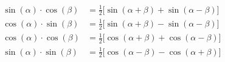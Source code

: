\begin{equation}
\begin{split}
    \sin(\alpha) \cdot \cos(\beta) &= \frac{1}{2} \Big[ \sin(\alpha + \beta) + \sin(\alpha - \beta) \Big] \\
    \cos(\alpha) \cdot \sin(\beta) &= \frac{1}{2} \Big[ \sin(\alpha + \beta) - \sin(\alpha - \beta) \Big] \\
    \cos(\alpha) \cdot \cos(\beta) &= \frac{1}{2} \Big[ \cos(\alpha + \beta) + \cos(\alpha - \beta) \Big] \\
    \sin(\alpha) \cdot \sin(\beta) &= \frac{1}{2} \Big[ \cos(\alpha - \beta) - \cos(\alpha + \beta) \Big]
\end{split}
\end{equation}